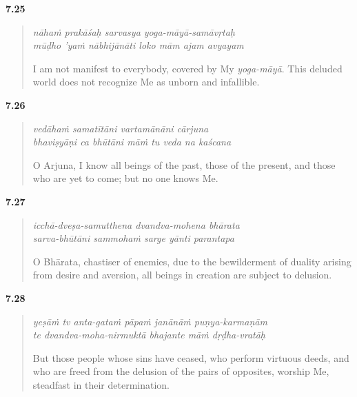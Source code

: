 \par\noindent\textbf{7.25}\par
\begin{verse}
\textit{nāhaṁ prakāśaḥ sarvasya yoga-māyā-samāvṛtaḥ} \\
\textit{mūḍho ’yaṁ nābhijānāti loko mām ajam avyayam}

\noindent I am not manifest to everybody, covered by My \textit{yoga-māyā}. This deluded world does not recognize Me as unborn and infallible.
\end{verse}
\par



\par\noindent\textbf{7.26}\par
\begin{verse}
\textit{vedāhaṁ samatītāni vartamānāni cārjuna} \\
\textit{bhaviṣyāṇi ca bhūtāni māṁ tu veda na kaścana}

\noindent O Arjuna, I know all beings of the past, those of the present, and those who are yet to come; but no one knows Me.
\end{verse}
\par



\par\noindent\textbf{7.27}\par
\begin{verse}
\textit{icchā-dveṣa-samutthena dvandva-mohena bhārata} \\
\textit{sarva-bhūtāni sammohaṁ sarge yānti parantapa}

\noindent O Bhārata, chastiser of enemies, due to the bewilderment of duality arising from desire and aversion, all beings in creation are subject to delusion.
\end{verse}
\par



\par\noindent\textbf{7.28}\par
\begin{verse}
\textit{yeṣāṁ tv anta-gataṁ pāpaṁ janānāṁ puṇya-karmaṇām} \\
\textit{te dvandva-moha-nirmuktā bhajante māṁ dṛḍha-vratāḥ}

\noindent But those people whose sins have ceased, who perform virtuous deeds, and who are freed from the delusion of the pairs of opposites, worship Me, steadfast in their determination.
\end{verse}
\par



